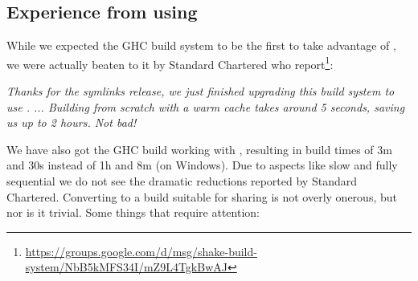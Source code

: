 \subsection{Experience from using \Cloud \Shake}\label{sec-using-cloud-shake}

While we expected the GHC build system to be the first to take advantage of
\Cloud \Shake, we were actually beaten to it by Standard Chartered who
report\footnote{\url{https://groups.google.com/d/msg/shake-build-system/NbB5kMFS34I/mZ9L4TgkBwAJ}}:

\vspace{1mm}
\begin{center}
\parbox{0.8 \textwidth}{\emph{Thanks for the symlinks release, we just finished upgrading this build
system to use \cmd{-}. ... Building from scratch with a warm cache
takes around 5 seconds, saving us up to 2 hours. Not bad!}}
\end{center}
\vspace{1mm}

We have also got the GHC build working with \Cloud \Shake, resulting in build
times of 3m and 30s instead of 1h and 8m (on Windows). Due to aspects like slow
and fully sequential  we do not see the dramatic reductions
reported by Standard Chartered. Converting to a build suitable for sharing is
not overly onerous, but nor is it trivial. Some things that require attention:

